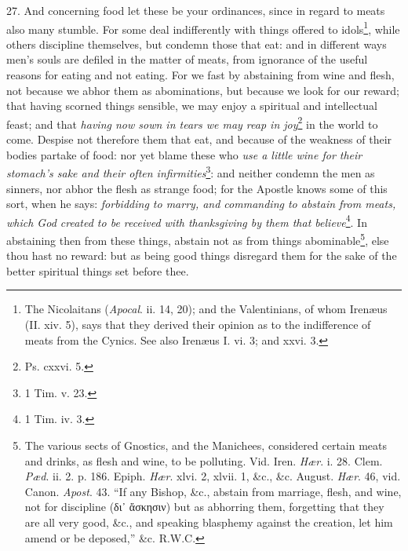 27. And concerning food let these be your ordinances, since in regard to meats also many stumble. For some deal indifferently with things offered to idols\footnote{The Nicolaitans (\emph{Apocal}. ii. 14, 20); and the Valentinians, of whom Irenæus (II. xiv. 5), says that they derived their opinion as to the indifference of meats from the Cynics. See also Irenæus I. vi. 3; and xxvi. 3.}, while others discipline themselves, but condemn those that eat: and in different ways men’s souls are defiled in the matter of meats, from ignorance of the useful reasons for eating and not eating. For we fast by abstaining from wine and flesh, not because we abhor them as abominations, but because we look for our reward; that having scorned things sensible, we may enjoy a spiritual and intellectual feast; and that \emph{having now sown in tears we may reap in joy}\footnote{Ps. cxxvi. 5.} in the world to come. Despise not therefore them that eat, and because of the weakness of their bodies partake of food: nor yet blame these who \emph{use a little wine for their stomach’s sake and their often infirmities}\footnote{1 Tim. v. 23.}: and neither condemn the men as sinners, nor abhor the flesh as strange food; for the Apostle knows some of this sort, when he says: \emph{forbidding to marry, and commanding to abstain from meats, which God created to be received with thanksgiving by them that believe}\footnote{1 Tim. iv. 3.}. In abstaining then from these things, abstain not as from things abominable\footnote{The various sects of Gnostics, and the Manichees, considered certain meats and drinks, as flesh and wine, to be polluting. Vid. Iren. \emph{Hær}. i. 28. Clem. \emph{Pæd}. ii. 2. p. 186. Epiph. \emph{Hær}. xlvi. 2, xlvii. 1, \&c., \&c. August. \emph{Hær}. 46, vid. Canon. \emph{Apost}. 43. “If any Bishop, \&c., abstain from marriage, flesh, and wine, not for discipline (\textgreek{δι᾽ ἄσκησιν}) but as abhorring them, forgetting that they are all very good, \&c., and speaking blasphemy against the creation, let him amend or be deposed,” \&c. \textsc{R.W.C.}}, else thou hast no reward: but as being good things disregard them for the sake of the better spiritual things set before thee.

